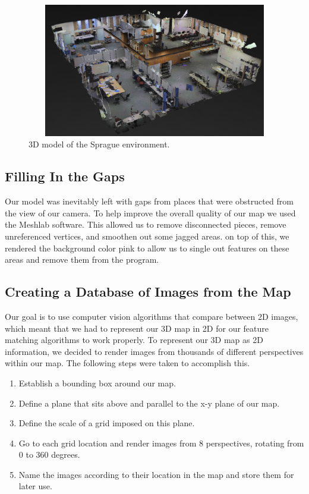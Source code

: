 \documentclass[a4paper,11pt]{article}
\begin{document}
 \begin{figure}[h!]
   \centering
     \includegraphics[height=2.3in,width=5.5in,angle=0]{../Artifacts/rp1}
 \caption{3D model of the Sprague environment.}
\end{figure}

  \subsection{Filling In the Gaps}
  Our model was inevitably left with gaps from places that were obstructed from the view of our camera. To help improve the overall quality of our map we used the Meshlab software. This allowed us to remove disconnected pieces, remove unreferenced vertices, and smoothen out some jagged areas. on top of this, we rendered the background color pink to allow us to single out features on these areas and remove them from the program. 
  
  \subsection{Creating a Database of Images from the Map}
  Our goal is to use computer vision algorithms that compare between 2D images, which meant that we had to represent our 3D map in 2D for our feature matching algorithms to work properly. To represent our 3D map as 2D information, we decided to render images from thousands of different perspectives within our map. The following steps were taken to accomplish this.
  \begin{enumerate}
  \item Establish a bounding box around our map.
  \item Define a plane that sits above and parallel to the x-y plane of our map.
  \item Define the scale of a grid imposed on this plane.
  \item Go to each grid location and render images from 8 perspectives, rotating from 0 to 360 degrees.
  \item Name the images according to their location in the map and store them for later use.
  \end{enumerate} 
\end{document}
